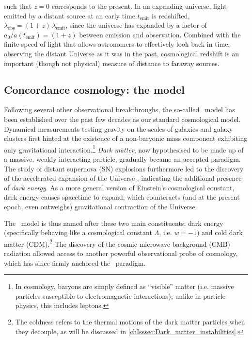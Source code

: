 \noindent such that $z = 0$ corresponds to the present. In an expanding universe, light emitted by a distant source at an early time $t_\text{emit}$ is redshifted, $\lambda_\text{obs} = (1 + z) \, \lambda_\text{emit}$, since the universe has expanded by a factor of $a_0 / a(t_\text{emit}) = (1 + z)$ between emission and observation. Combined with the finite speed of light that allows astronomers to effectively look back in time, observing the distant Universe as it was in the past, cosmological redshift is an important (though not physical) measure of distance to faraway sources.

\subsection{Concordance cosmology: the \texorpdfstring{\LCDM}{ΛCDM} model}
\label{chIssec:LCDM_model}

Following several other observational breakthroughs, the so-called \LCDM\ model has been established over the past few decades as our standard cosmological model. Dynamical measurements testing gravity on the scales of galaxies and galaxy clusters \citep{1933AcHPh...6..110Z, 1973A&A....26..483R, 1974Natur.250..309E, 1974ApJ...193L...1O, 1978ApJ...225L.107R, 1980ApJ...238..471R} first hinted at the existence of a non-baryonic mass component exhibiting only gravitational interaction.\footnote{In cosmology, baryons are simply defined as ``visible'' matter (i.e. massive particles susceptible to electromagnetic interactions); unlike in particle physics, this includes leptons.} \textit{Dark matter}, now hypothesised to be made up of a massive, weakly interacting particle, gradually became an accepted paradigm. The study of distant supernova (SN) explosions furthermore led to the discovery of the accelerated expansion of the Universe \citep{1998AJ....116.1009R, 1998ApJ...507...46S, 1999ApJ...517..565P}, indicating the additional presence of \textit{dark energy}. As a more general version of Einstein's cosmological constant, dark energy causes spacetime to expand, which counteracts (and at the present epoch, even outweighs) gravitational contraction of the Universe.

The \LCDM\ model is thus named after these two main constituents: dark energy (specifically behaving like a cosmological constant $\Lambda$, i.e. $w = -1$) and cold dark matter (CDM).\footnote{The coldness refers to the thermal motions of the dark matter particles when they decouple, as will be discussed in \cref{chIsssec:Dark_matter_instabilities}.} The discovery of the cosmic microwave background (CMB) radiation \citep{1965ApJ...142..419P, 1965ApJ...142..414D} allowed access to another powerful observational probe of cosmology, which has since firmly anchored the \LCDM\ paradigm.

